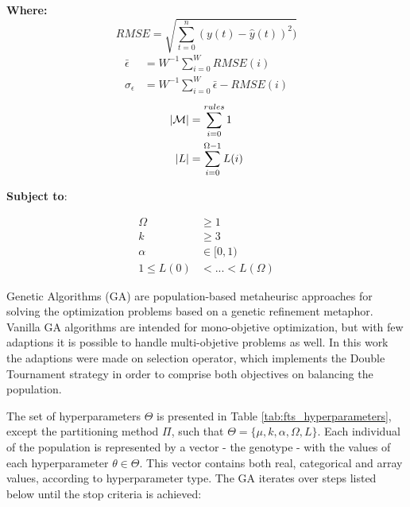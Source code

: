 \textbf{Where:}
\begin{equation}
RMSE = \sqrt{\sum_{t=0}^n (y(t) - \hat{y}(t))^2 )}
 \label{eqn:hyperopt_rmse}
\end{equation}
\begin{align}
\bar{\epsilon} & =  W^{-1}\sum_{i=0}^W RMSE(i) \label{eqn:hyperopt_error_avg} \\
\sigma_\epsilon & =  W^{-1}\sum_{i=0}^W \bar{\epsilon} - RMSE(i)  \label{eqn:hyperopt_error_std}
\end{align}
\begin{align}
|\mathcal{M}| &= \sum_{i=0}^{rules} 1  \label{eqn:hyperopt_num_rules} \\
|L| &= \sum_{i=0}^{\Omega-1} L(i)  \label{eqn:hyperopt_lags_sum} 
\end{align}

\textbf{Subject to}:

\begin{align}
\Omega &\geq 1  \label{eqn:hyperopt_order}\\
k &\geq 3  \label{eqn:hyperopt_num_partitions}\\
\alpha &\in [0,1)  \label{eqn:hyperopt_alpha_cut}\\
1 \leq L(0) & < ... < L(\Omega)  \label{eqn:hyperopt_lag_inc}
\end{align}

Genetic Algorithms (GA) are population-based metaheurisc approaches for solving the optimization problems based on a genetic refinement metaphor. Vanilla GA algorithms are intended for mono-objetive optimization, but with few adaptions it is possible to handle multi-objetive problems as well. In this work the adaptions were made on selection operator, which implements the Double Tournament strategy in order to comprise both objectives on balancing the population.

The set of hyperparameters $\Theta$ is presented in Table \ref{tab:fts_hyperparameters}, except the partitioning method $\Pi$, such that $\Theta = \{\mu,k,\alpha,\Omega,L\}$. Each individual of the population is represented by a vector - the genotype - with the values of each hyperparameter $\theta \in \Theta$. This vector contains both real, categorical and array values, according to hyperparameter type. The GA iterates over steps listed below until the stop criteria is achieved:

